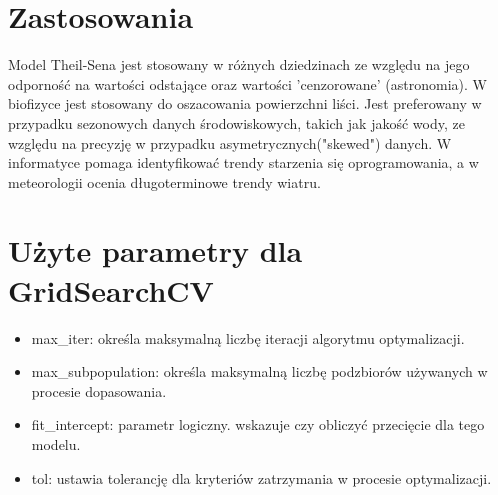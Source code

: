 {}
\section*{Zastosowania \cite{Fernandes2005, hirsch1982techniques, vaidyanathan2005comprehensive, akritas1995theil, romanic2014long} }
\vspace{-1.0em}
\label{sec:ml_challenges}

\hspace{1.5cm} Model Theil-Sena jest stosowany w różnych dziedzinach ze względu na jego odporność na wartości odstające oraz wartości 'cenzorowane' (astronomia). W biofizyce jest stosowany do oszacowania powierzchni liści. Jest preferowany w przypadku sezonowych danych środowiskowych, takich jak jakość wody, ze względu na precyzję w przypadku asymetrycznych("skewed") danych. W informatyce pomaga identyfikować trendy starzenia się oprogramowania, a w meteorologii ocenia długoterminowe trendy wiatru.



{}
\section*{Użyte parametry dla GridSearchCV \cite{url_TheilSenRegressor, url_grid_search}}
\vspace{-1.0em}
\label{sec:ml_challenges}

\begin{itemize}
\setlength\itemsep{-0.5em}
\item max\_iter: określa maksymalną liczbę iteracji algorytmu optymalizacji.
\item max\_subpopulation: określa maksymalną liczbę podzbiorów używanych w procesie dopasowania.
\item fit\_intercept: parametr logiczny. wskazuje czy obliczyć przecięcie dla tego modelu.
\item tol: ustawia tolerancję dla kryteriów zatrzymania w procesie optymalizacji.
\end{itemize}

\noindent\makebox[\linewidth]{\rule{\paperwidth}{0.4pt}}
